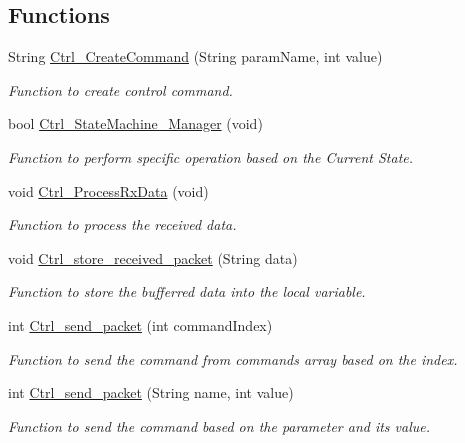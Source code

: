 \subsection*{Functions}
\begin{DoxyCompactItemize}
\item 
String \hyperlink{group___state_control_module_gae547d9c33c082f82dc04a8dd2be788ba}{Ctrl\+\_\+\+Create\+Command} (String param\+Name, int value)
\begin{DoxyCompactList}\small\item\em Function to create control command. \end{DoxyCompactList}\item 
bool \hyperlink{group___state_control_module_ga0926cce894ccf2232698c5be4b94e09e}{Ctrl\+\_\+\+State\+Machine\+\_\+\+Manager} (void)
\begin{DoxyCompactList}\small\item\em Function to perform specific operation based on the Current State. \end{DoxyCompactList}\item 
void \hyperlink{group___state_control_module_ga9b6ec4e2da235c08b203af26edcfff72}{Ctrl\+\_\+\+Process\+Rx\+Data} (void)
\begin{DoxyCompactList}\small\item\em Function to process the received data. \end{DoxyCompactList}\item 
void \hyperlink{group___state_control_module_ga6591c14e3084f61ee1e51057d2baa269}{Ctrl\+\_\+store\+\_\+received\+\_\+packet} (String data)
\begin{DoxyCompactList}\small\item\em Function to store the bufferred data into the local variable. \end{DoxyCompactList}\item 
int \hyperlink{group___state_control_module_gaadae19019609b8a7e5ecb1b84497d2d4}{Ctrl\+\_\+send\+\_\+packet} (int command\+Index)
\begin{DoxyCompactList}\small\item\em Function to send the command from commands array based on the index. \end{DoxyCompactList}\item 
int \hyperlink{group___state_control_module_ga399a7a74edee153c91847adbcba0de2a}{Ctrl\+\_\+send\+\_\+packet} (String name, int value)
\begin{DoxyCompactList}\small\item\em Function to send the command based on the parameter and its value. \end{DoxyCompactList}\item 

\end{DoxyCompactItemize}
